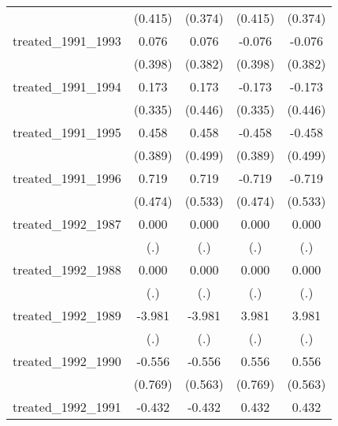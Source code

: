 {\begin{tabular}{l*{4}{c}}
            &     (0.415)         &     (0.374)         &     (0.415)         &     (0.374)         \\
[1em]
treated\_1991\_1993&       0.076         &       0.076         &      -0.076         &      -0.076         \\
            &     (0.398)         &     (0.382)         &     (0.398)         &     (0.382)         \\
[1em]
treated\_1991\_1994&       0.173         &       0.173         &      -0.173         &      -0.173         \\
            &     (0.335)         &     (0.446)         &     (0.335)         &     (0.446)         \\
[1em]
treated\_1991\_1995&       0.458         &       0.458         &      -0.458         &      -0.458         \\
            &     (0.389)         &     (0.499)         &     (0.389)         &     (0.499)         \\
[1em]
treated\_1991\_1996&       0.719         &       0.719         &      -0.719         &      -0.719         \\
            &     (0.474)         &     (0.533)         &     (0.474)         &     (0.533)         \\
[1em]
treated\_1992\_1987&       0.000         &       0.000         &       0.000         &       0.000         \\
            &         (.)         &         (.)         &         (.)         &         (.)         \\
[1em]
treated\_1992\_1988&       0.000         &       0.000         &       0.000         &       0.000         \\
            &         (.)         &         (.)         &         (.)         &         (.)         \\
[1em]
treated\_1992\_1989&      -3.981         &      -3.981         &       3.981         &       3.981         \\
            &         (.)         &         (.)         &         (.)         &         (.)         \\
[1em]
treated\_1992\_1990&      -0.556         &      -0.556         &       0.556         &       0.556         \\
            &     (0.769)         &     (0.563)         &     (0.769)         &     (0.563)         \\
[1em]
treated\_1992\_1991&      -0.432         &      -0.432         &       0.432         &       0.432         \\

\end{tabular}}
